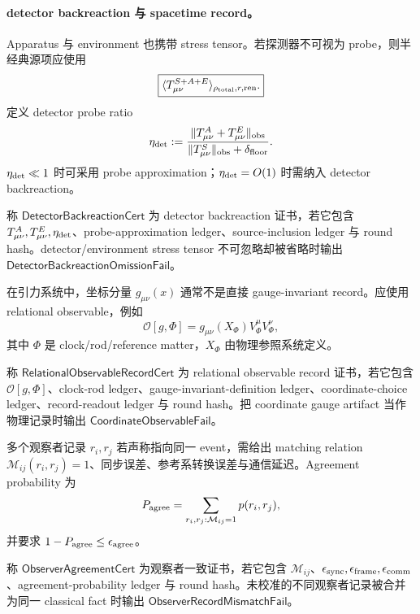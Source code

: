 \paragraph{detector backreaction 与 spacetime record。}
Apparatus 与 environment 也携带 stress tensor。若探测器不可视为 probe，则半经典源项应使用
\[
\boxed{
\langle T_{\mu\nu}^{S+A+E}\rangle_{\rho_{\rm total},r,{\rm ren}}.
}
\]
定义 detector probe ratio
\[
\eta_{\rm det}
:=
\frac{\|T_{\mu\nu}^A+T_{\mu\nu}^E\|_{\rm obs}}
{\|T_{\mu\nu}^S\|_{\rm obs}+\delta_{\rm floor}}.
\]
\(\eta_{\rm det}\ll1\) 时可采用 probe approximation；\(\eta_{\rm det}=O(1)\) 时需纳入 detector backreaction。

\begin{definition}\label{def:typed-address-biaxial-completion-detector-backreaction-cert}
称 \(\mathsf{DetectorBackreactionCert}\) 为 detector backreaction 证书，若它包含 \(T_{\mu\nu}^A,T_{\mu\nu}^E,\eta_{\rm det}\)、probe-approximation ledger、source-inclusion ledger 与 round hash。detector/environment stress tensor 不可忽略却被省略时输出 \(\mathsf{DetectorBackreactionOmissionFail}\)。
\end{definition}

在引力系统中，坐标分量 \(g_{\mu\nu}(x)\) 通常不是直接 gauge-invariant record。应使用 relational observable，例如
\[
\boxed{
\mathcal O[g,\Phi]
=
g_{\mu\nu}(X_\Phi)V^\mu_\Phi V^\nu_\Phi,
}
\]
其中 \(\Phi\) 是 clock/rod/reference matter，\(X_\Phi\) 由物理参照系统定义。

\begin{definition}\label{def:typed-address-biaxial-completion-relational-observable-record-cert}
称 \(\mathsf{RelationalObservableRecordCert}\) 为 relational observable record 证书，若它包含 \(\mathcal O[g,\Phi]\)、clock-rod ledger、gauge-invariant-definition ledger、coordinate-choice ledger、record-readout ledger 与 round hash。把 coordinate gauge artifact 当作物理记录时输出 \(\mathsf{CoordinateObservableFail}\)。
\end{definition}

多个观察者记录 \(r_i,r_j\) 若声称指向同一 event，需给出 matching relation \(\mathcal M_{ij}(r_i,r_j)=1\)、同步误差、参考系转换误差与通信延迟。Agreement probability 为
\[
P_{\rm agree}
=
\sum_{r_i,r_j:\mathcal M_{ij}=1}p(r_i,r_j),
\]
并要求 \(1-P_{\rm agree}\le\epsilon_{\rm agree}\)。

\begin{definition}[观察者一致证书]\label{def:typed-address-biaxial-completion-observer-agreement-cert}
称 \(\mathsf{ObserverAgreementCert}\) 为观察者一致证书，若它包含 \(\mathcal M_{ij}\)、\(\epsilon_{\rm sync},\epsilon_{\rm frame},\epsilon_{\rm comm}\)、agreement-probability ledger 与 round hash。未校准的不同观察者记录被合并为同一 classical fact 时输出 \(\mathsf{ObserverRecordMismatchFail}\)。
\end{definition}

